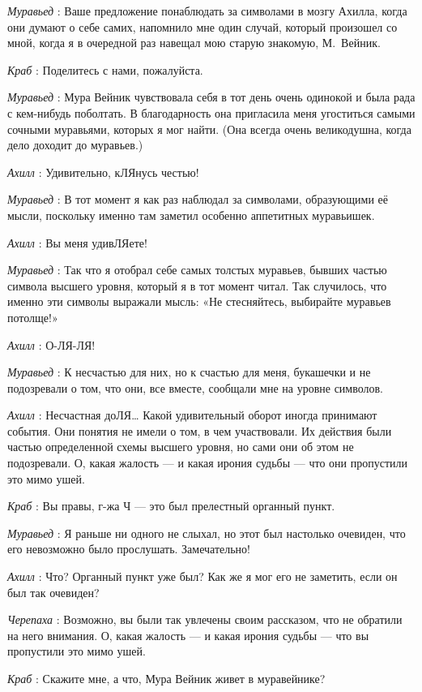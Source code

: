 \documentclass[../main.tex]{subfiles}
\begin{document}
\begin{dialogue}
\emph{Муравьед} : Ваше предложение понаблюдать за символами в мозгу Ахилла, когда они думают о себе самих, напомнило мне один случай, который произошел со мной, когда я в очередной раз навещал мою старую знакомую, М.~Вейник.

\emph{Краб} : Поделитесь с нами, пожалуйста.

\emph{Муравьед} : Мура Вейник чувствовала себя в тот день очень одинокой и была рада с кем-нибудь поболтать. В благодарность она пригласила меня угоститься самыми сочными муравьями, которых я мог найти. (Она всегда очень великодушна, когда дело доходит до муравьев.)

\emph{Ахилл} : Удивительно, кЛЯнусь честью!

\emph{Муравьед} : В тот момент я как раз наблюдал за символами, образующими её мысли, поскольку именно там заметил особенно аппетитных муравьишек.

\emph{Ахилл} : Вы меня удивЛЯете!

\emph{Муравьед} : Так что я отобрал себе самых толстых муравьев, бывших частью символа высшего уровня, который я в тот момент читал. Так случилось, что именно эти символы выражали мысль: «Не стесняйтесь, выбирайте муравьев потолще!»

\emph{Ахилл} : О-ЛЯ-ЛЯ!

\emph{Муравьед} : К несчастью для них, но к счастью для меня, букашечки и не подозревали о том, что они, все вместе, сообщали мне на уровне символов.

\emph{Ахилл} : Несчастная доЛЯ\ldots{} Какой удивительный оборот иногда принимают события. Они понятия не имели о том, в чем участвовали. Их действия были частью определенной схемы высшего уровня, но сами они об этом не подозревали. О, какая жалость --- и какая ирония судьбы --- что они пропустили это мимо ушей.

\emph{Краб} : Вы правы, г-жа Ч --- это был прелестный органный пункт.

\emph{Муравьед} : Я раньше ни одного не слыхал, но этот был настолько очевиден, что его невозможно было прослушать. Замечательно!

\emph{Ахилл} : Что? Органный пункт уже был? Как же я мог его не заметить, если он был так очевиден?

\emph{Черепаха} : Возможно, вы были так увлечены своим рассказом, что не обратили на него внимания. О, какая жалость --- и какая ирония судьбы --- что вы пропустили это мимо ушей.

\emph{Краб} : Скажите мне, а что, Мура Вейник живет в муравейнике?


\end{dialogue}
\end{document}
